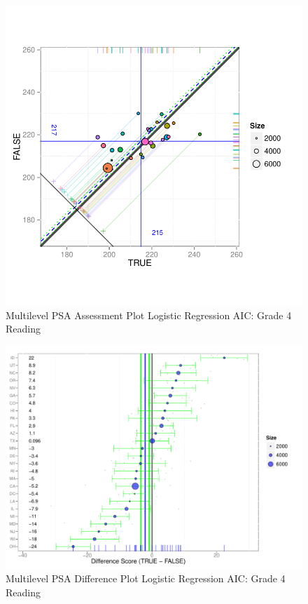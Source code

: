 \begin{figure}[h!]
\begin{center}
\includegraphics[width=\textwidth]{../Figures2009/g4read-mlpsa-lrAIC-circ.pdf}
\caption{Multilevel PSA Assessment Plot Logistic Regression AIC: Grade 4 Reading}
\end{center}
\end{figure}

\begin{figure}[h!]
\begin{center}
\includegraphics[width=\textwidth]{../Figures2009/g4read-mlpsa-lrAIC-diff.pdf}
\caption{Multilevel PSA Difference Plot Logistic Regression AIC: Grade 4 Reading}
\end{center}
\end{figure}

